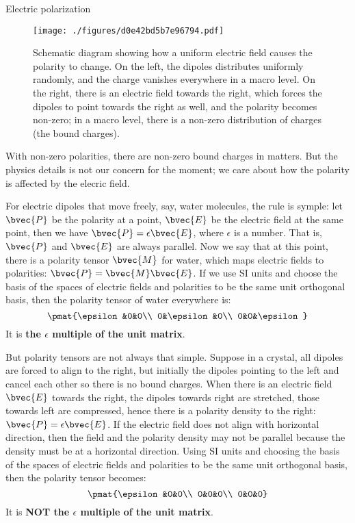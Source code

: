 \begin{example}{Electric polarization}
\begin{figure}[ht]
\centering
\texttt{[image: ./figures/d0e42bd5b7e96794.pdf]}
\caption{Schematic diagram showing how a uniform electric field causes the polarity to change. On the left, the dipoles distributes uniformly randomly, and the charge vanishes everywhere in a macro level. On the right, there is an electric field towards the right, which forces the dipoles to point towards the right as well, and the polarity becomes non-zero; in a macro level, there is a non-zero distribution of charges (the bound charges). } \label{fig_TestT_1}
\end{figure}




With non-zero polarities, there are non-zero bound charges in matters. But the physics details is not our concern for the moment; we care about how the polarity is affected by the elecric field. 

For electric dipoles that move freely, say, water molecules, the rule is symple: let $\bvec{P}$ be the polarity at a point, $\bvec{E}$ be the electric field at the same point, then we have $\bvec{P}=\epsilon\bvec{E}$, where $\epsilon$ is a number. That is, $\bvec{P}$ and $\bvec{E}$ are always parallel. Now we say that at this point, there is a polarity tensor $\bvec{M}$ for water, which maps electric fields to polarities: $\bvec{P}=\bvec{M}\bvec{E}$. If we use SI units and choose the basis of the spaces of electric fields and polarities to be the same unit orthogonal basis, then the polarity tensor of water everywhere is: 
\begin{equation}
\pmat{\epsilon&0&0\\ 0&\epsilon&0\\ 0&0&\epsilon}
\end{equation}
It is \textbf{the $\epsilon$ multiple of the unit matrix}. 

But polarity tensors are not always that simple. Suppose in a crystal, all dipoles are forced to align to the right, but initially the dipoles pointing to the left and cancel each other so there is no bound charges. When there is an electric field $\bvec{E}$ towards the right, the dipoles towards right are stretched, those towards left are compressed, hence there is a polarity density to the right: $\bvec{P}=\epsilon\bvec{E}$. If the electric field does not align with horizontal direction, then the field and the polarity density may not be parallel because the density must be at a horizontal direction. Using SI units and choosing the basis of the spaces of electric fields and polarities to be the same unit orthogonal basis, then the polarity tensor becomes: 
\begin{equation}
\pmat{\epsilon&0&0\\ 0&0&0\\ 0&0&0}
\end{equation}
It is \textbf{NOT the $\epsilon$ multiple of the unit matrix}. 


\end{example}
